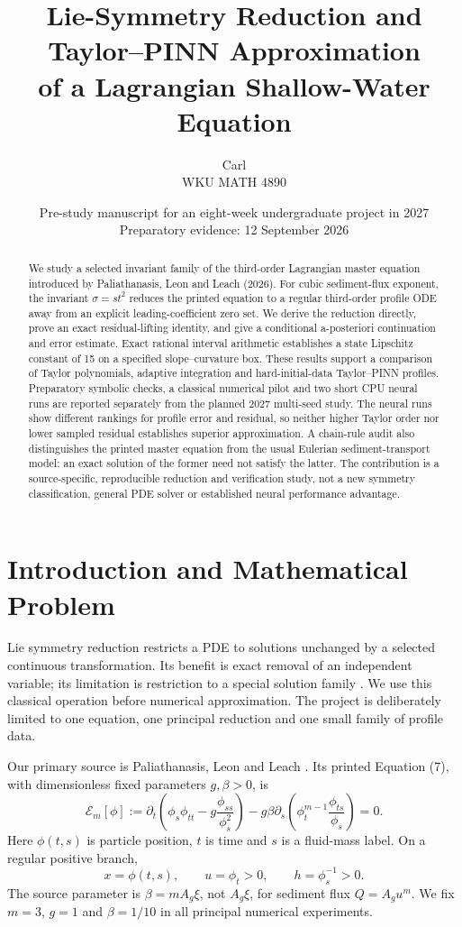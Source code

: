 \documentclass[11pt,a4paper]{article}
\title{Lie-Symmetry Reduction and Taylor--PINN Approximation\\
of a Lagrangian Shallow-Water Equation}
\author{Carl\\WKU MATH 4890}
\date{Pre-study manuscript for an eight-week undergraduate project in 2027\\
Preparatory evidence: 12 September 2026}
\theoremstyle{definition}
\theoremstyle{remark}
\newcommand{\E}{\mathcal E}
\begin{document}
\maketitle

\begin{abstract}
We study a selected invariant family of the third-order Lagrangian master equation introduced by Paliathanasis, Leon and Leach (2026). For cubic sediment-flux exponent, the invariant $\sigma=st^2$ reduces the printed equation to a regular third-order profile ODE away from an explicit leading-coefficient zero set. We derive the reduction directly, prove an exact residual-lifting identity, and give a conditional a-posteriori continuation and error estimate. Exact rational interval arithmetic establishes a state Lipschitz constant of 15 on a specified slope--curvature box. These results support a comparison of Taylor polynomials, adaptive integration and hard-initial-data Taylor--PINN profiles. Preparatory symbolic checks, a classical numerical pilot and two short CPU neural runs are reported separately from the planned 2027 multi-seed study. The neural runs show different rankings for profile error and residual, so neither higher Taylor order nor lower sampled residual establishes superior approximation. A chain-rule audit also distinguishes the printed master equation from the usual Eulerian sediment-transport model: an exact solution of the former need not satisfy the latter. The contribution is a source-specific, reproducible reduction and verification study, not a new symmetry classification, general PDE solver or established neural performance advantage.
\end{abstract}

\section{Introduction and Mathematical Problem}\label{sec:problem}
Lie symmetry reduction restricts a PDE to solutions unchanged by a selected continuous transformation. Its benefit is exact removal of an independent variable; its limitation is restriction to a special solution family \cite{olver}. We use this classical operation before numerical approximation. The project is deliberately limited to one equation, one principal reduction and one small family of profile data.

Our primary source is Paliathanasis, Leon and Leach \cite{lagrange}. Its printed Equation (7), with dimensionless fixed parameters $g,\beta>0$, is
\begin{equation}
\E_m[\phi]:=
\partial_t\left(\phi_s\phi_{tt}-g\frac{\phi_{ss}}{\phi_s^2}\right)
-g\beta\partial_s\left(\phi_t^{m-1}\frac{\phi_{ts}}{\phi_s}\right)=0.
\label{eq:master}
\end{equation}
Here $\phi(t,s)$ is particle position, $t$ is time and $s$ is a fluid-mass label. On a regular positive branch,
\begin{equation}
x=\phi(t,s),\qquad u=\phi_t>0,\qquad h=\phi_s^{-1}>0.
\label{eq:map}
\end{equation}
The source parameter is $\beta=mA_g\xi$, not $A_g\xi$, for sediment flux $Q=A_gu^m$. We fix $m=3$, $g=1$ and $\beta=1/10$ in all principal numerical experiments.
\end{document}
